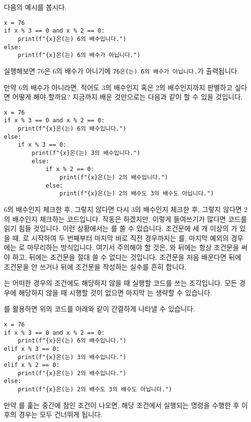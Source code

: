\documentclass[../main.tex]{subfiles}
\begin{document}
다음의 예시를 봅시다.
\begin{verbatim}
x = 76
if x % 3 == 0 and x % 2 == 0:
    print(f"{x}은(는) 6의 배수입니다.")
else:
    print(f"{x}은(는) 6의 배수가 아닙니다.")
\end{verbatim}
실행해보면 76은 6의 배수가 아니기에 \verb/76은(는) 6의 배수가 아닙니다./가 출력됩니다.

만약 6의 배수가 아니라면, 적어도 3의 배수인지 혹은 2의 배수인지까지 판별하고
싶다면 어떻게 해야 할까요?
지금까지 배운 것만으로는 다음과 같이 할 수 있을 것입니다.
\begin{verbatim}
x = 76
if x % 3 == 0 and x % 2 == 0:
    print(f"{x}은(는) 6의 배수입니다.")
else:
    if x % 3 == 0:
        print(f"{x}은(는) 3의 배수입니다.")
        else:
            if x % 2 == 0:
                print(f"{x}은(는) 2의 배수입니다.")
            else:
                print(f"{x}은(는) 2의 배수도 3의 배수도 아닙니다.")
\end{verbatim}
6의 배수인지 체크한 후, 그렇지 않다면 다시 3의 배수인지 체크한 후, 그렇지
않다면 2의 배수인지 체크하는 코드입니다.
작동은 하겠지만, 이렇게 들여쓰기가 많다면 코드를 읽기 힘들 것입니다.
이런 상황에서는 를 쓸 수 있습니다.
조건문에 세 개 이상의 가 있을 때, 로 시작하여 두 번째부터 마지막 바로 직전
경우까지는 를, 마지막 예외의 경우에는 로 마무리하는
방식입니다.
여기서 주의해야 할 것은, 와  뒤에는 항상 조건문을 써야 하고,  뒤에는 조건문을 절대 쓸 수 없다는 것입니다.
조건문을 처음 배운다면  뒤에 조건문을 안 쓰거나  뒤에 조건문을 작성하는 실수를 흔히 합니다.

는 어떠한 경우의 조건에도 해당하지 않을 때 실행할 코드를 쓰는 조각입니다.
모든 경우에 해당하지 않을 때 시행할 것이 없으면 마지막
는 생략할 수 있습니다.

를 활용하면 위의 코드를 아래와 같이 간결하게 나타낼 수 있습니다.
\begin{verbatim}
x = 76
if x % 3 == 0 and x % 2 == 0:
    print(f"{x}은(는) 6의 배수입니다.")
elif x % 3 == 0:
    print(f"{x}은(는) 3의 배수입니다.")
elif x % 2 == 0:
    print(f"{x}은(는) 2의 배수입니다.")
else:
    print(f"{x}은(는) 2의 배수도 3의 배수도 아닙니다.")
\end{verbatim}
만약 를 훑는 중간에 참인 조건이 나오면, 해당
조건에서 실행되는 명령을 수행한 후 이후의 경우는 모두 건너뛰게 됩니다.
\end{document}
